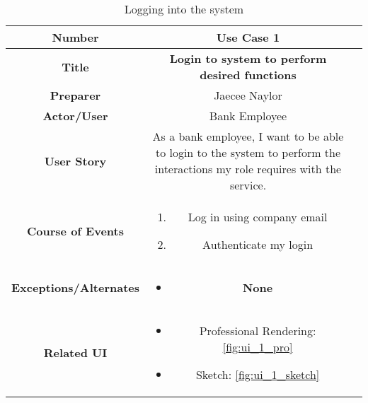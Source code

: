 \begin{table}[H]
    \centering
    \begin{tabularx}{0.75\linewidth}{||Sc|X||}
        \hline
        \hline
        \textbf{Number} & \textbf{Use Case 1} \\
        \hline
        \textbf{Title} & \textbf{Login to system to perform desired functions} \\
        \hline
        \textbf{Preparer} & Jaecee Naylor \\
        \hline
        \textbf{Actor/User} & Bank Employee \\
        \hline
        \textbf{User Story} &
        As a bank employee, I want to be able to login to the system to perform the interactions my role requires with the service. \\
        \hline
        \textbf{Course of Events} &
        \begin{minipage}[l]{\linewidth}
            \begin{enumerate}[wide, labelindent=0pt]
                \item Log in using company email
                \item Authenticate my login
            \end{enumerate}
            \vspace{2pt}
        \end{minipage} \\
        \hline
        \textbf{Exceptions/Alternates} & 
        \begin{minipage}[l]{\linewidth}
            \vspace{2pt}
            \begin{itemize}[wide, labelindent=0pt]
                \item \textbf{None}
            \end{itemize}
        \end{minipage} \\
        \hline
        \textbf{Related UI} & 
        \begin{minipage}[l]{\linewidth}
            \vspace{4pt}
            \begin{itemize}[wide, labelindent=0pt]
                \item Professional Rendering: \ref{fig:ui_1_pro}
                \item Sketch: \ref{fig:ui_1_sketch}
            \end{itemize}
            \vspace{4pt}
        \end{minipage} \\
        \hline
        \hline
    \end{tabularx}
    \caption{Logging into the system}
    \label{tab:use_case_login}
\end{table}

